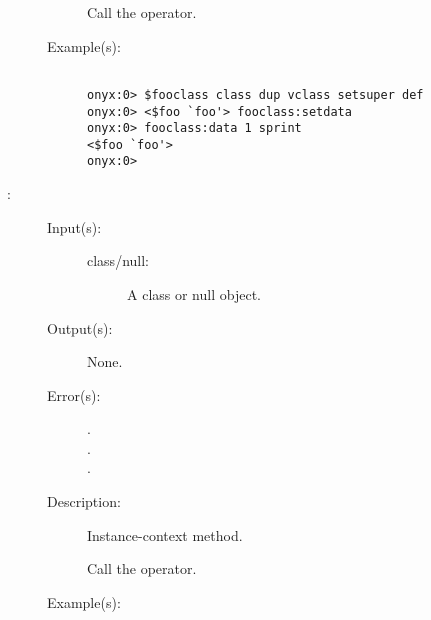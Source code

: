 \begin{description}
\begin{description}
		Call the 
		operator.
	\item[Example(s): ]\begin{verbatim}

onyx:0> $fooclass class dup vclass setsuper def
onyx:0> <$foo `foo'> fooclass:setdata
onyx:0> fooclass:data 1 sprint
<$foo `foo'>
onyx:0>
		\end{verbatim}
	\end{description}
\label{vclass:setisa}
\item[{\onyxop{class/null}{setisa}{--}}: ]
	\begin{description}\item[]
	\item[Input(s): ]
		\begin{description}\item[]
		\item[class/null: ]
			A class or null object.
		\end{description}
	\item[Output(s): ] None.
	\item[Error(s): ]
		\begin{description}\item[]
		\item[.]
		\item[.]
		\item[.]
		\end{description}
	\item[Description: ]
		Instance-context method.

		Call the 
		operator.
	\item[Example(s): ]\begin{verbatim}


\end{verbatim}
\end{description}
\end{description}
